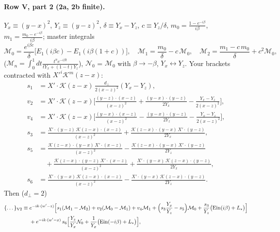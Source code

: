 \documentclass[10pt]{article}
\numberwithin{equation}{section}
\newcommand{\Ls}{L_{*}}
\newcommand{\KK}{\mathcal K}
\newcommand{\Ein}{\mathrm{Ein}}
\begin{document}
\paragraph{Row V, part 2 (2a, 2b finite).} $Y_x\equiv(y-x)^2$, $Y_z\equiv(y-z)^2$, $\delta\equiv Y_x-Y_z$, $c\equiv Y_z/\delta$, $m_0=\frac{1-e^{-i\beta}}{i\beta}$, $m_1=\frac{m_0-e^{-i\beta}}{i\beta}$; master integrals
\begin{equation*}
\mathcal M_0=\frac{e^{i\beta c}}{\delta}\big[E_1(i\beta c)-E_1(i\beta(1+c))\big],\quad\mathcal M_1=\frac{m_0}{\delta}-c\,\mathcal M_0,\quad\mathcal M_2=\frac{m_1-c\,m_0}{\delta}+c^2\mathcal M_0,
\end{equation*}
($\mathcal M_n=\int_0^1dt\frac{t^ne^{-i\beta t}}{tY_x+(1-t)Y_z}$), $\mathcal N_0$ = $\mathcal M_0$ with $\beta\to-\beta$, $Y_x\leftrightarrow Y_z$. Your brackets contracted with $X'^i\KK^m(z-x)$:
\begin{align*}
s_1&=X'\!\cdot\KK(z-x)\,\frac{d_\perp}{2(x-z)^2}(Y_x-Y_z),\\
v_2&=X'\!\cdot\KK(z-x)\Big[\frac{(y-z)\cdot(x-z)}{(x-z)^2}+\frac{(y-x)\cdot(y-z)}{2Y_x}-\frac{Y_x-Y_z}{2(x-z)^2}\Big],\\
v_4&=X'\!\cdot\KK(z-x)\Big[\frac{(y-x)\cdot(x-z)}{(x-z)^2}-\frac{(y-x)\cdot(y-z)}{2Y_z}-\frac{Y_x-Y_z}{2(x-z)^2}\Big],\\
s_3&=\frac{X'\!\cdot(y-z)\,\KK(z-x)\cdot(x-z)}{(x-z)^2}+\frac{\KK(z-x)\cdot(y-x)\,X'\!\cdot(y-z)}{2Y_x},\\
s_5&=\frac{\KK(z-x)\cdot(y-x)\,X'\!\cdot(x-z)}{(x-z)^2}-\frac{\KK(z-x)\cdot(y-x)\,X'\!\cdot(y-z)}{2Y_z}\\&\quad+\frac{\KK(z-x)\cdot(y-z)\,X'\!\cdot(x-z)}{(x-z)^2}+\frac{X'\!\cdot(y-x)\,\KK(z-x)\cdot(y-z)}{2Y_x},\\
s_6&=\frac{X'\!\cdot(y-x)\,\KK(z-x)\cdot(x-z)}{(x-z)^2}-\frac{X'\!\cdot(y-x)\,\KK(z-x)\cdot(y-z)}{2Y_z}.
\end{align*}
Then ($d_\perp=2$)
\begin{equation}
\begin{aligned}\{\dots\}_{\rm V2}\equiv{}&e^{-ik\cdot(w'-z)}\Big[s_1(\mathcal M_1-\mathcal M_2)+v_2(\mathcal M_0-\mathcal M_1)+v_4\mathcal M_1+\Big(s_3\frac{Y_x}{Y_z}-s_5\Big)\mathcal M_0+\frac{s_3}{Y_z}\big(\Ein(i\beta)+\Ls\big)\Big]\\
&+e^{-ik\cdot(w'-x)}\,s_6\Big[\frac{Y_z}{Y_x}\mathcal N_0+\frac{1}{Y_x}\big(\Ein(-i\beta)+\Ls\big)\Big],\end{aligned}
\label{eq:V2br}
\end{equation}
\end{document}
